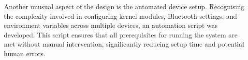 Another unusual aspect of the design is the automated device setup. Recognising the complexity involved in configuring kernel modules, Bluetooth settings, and environment variables across multiple devices, an automation script was developed. This script ensures that all prerequisites for running the system are met without manual intervention, significantly reducing setup time and potential human errors.





